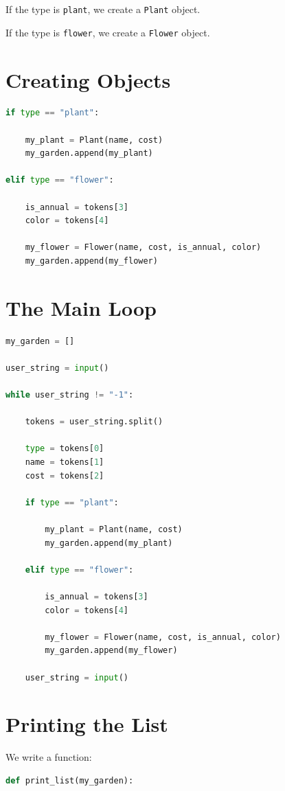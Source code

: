 \documentclass[11pt]{article}
\begin{document}
If the type is \texttt{plant}, we create a \texttt{Plant} object.

If the type is \texttt{flower}, we create a \texttt{Flower} object.

\section{Creating Objects}

\begin{lstlisting}[language=Python]
if type == "plant":

    my_plant = Plant(name, cost)
    my_garden.append(my_plant)

elif type == "flower":

    is_annual = tokens[3]
    color = tokens[4]

    my_flower = Flower(name, cost, is_annual, color)
    my_garden.append(my_flower)
\end{lstlisting}

\section{The Main Loop}

\begin{lstlisting}[language=Python]
my_garden = []

user_string = input()

while user_string != "-1":

    tokens = user_string.split()

    type = tokens[0]
    name = tokens[1]
    cost = tokens[2]

    if type == "plant":

        my_plant = Plant(name, cost)
        my_garden.append(my_plant)

    elif type == "flower":

        is_annual = tokens[3]
        color = tokens[4]

        my_flower = Flower(name, cost, is_annual, color)
        my_garden.append(my_flower)

    user_string = input()
\end{lstlisting}

\section{Printing the List}

We write a function:

\begin{lstlisting}[language=Python]
def print_list(my_garden):
\end{lstlisting}
\end{document}
